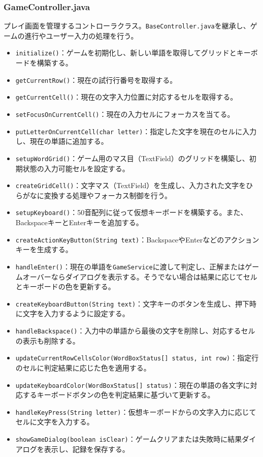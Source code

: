 \documentclass[a4j]{ujarticle}
\begin{document}
\subsubsection{GameController.java}
プレイ画面を管理するコントローラクラス。\texttt{BaseController.java}を継承し、ゲームの進行やユーザー入力の処理を行う。

\begin{itemize}
  \item \texttt{initialize()}：ゲームを初期化し、新しい単語を取得してグリッドとキーボードを構築する。
  \item \texttt{getCurrentRow()}：現在の試行行番号を取得する。
  \item \texttt{getCurrentCell()}：現在の文字入力位置に対応するセルを取得する。
  \item \texttt{setFocusOnCurrentCell()}：現在の入力セルにフォーカスを当てる。
  \item \texttt{putLetterOnCurrentCell(char letter)}：指定した文字を現在のセルに入力し、現在の単語に追加する。
  \item \texttt{setupWordGrid()}：ゲーム用のマス目（TextField）のグリッドを構築し、初期状態の入力可能セルを設定する。
  \item \texttt{createGridCell()}：文字マス（TextField）を生成し、入力された文字をひらがなに変換する処理やフォーカス制御を行う。
  \item \texttt{setupKeyboard()}：50音配列に従って仮想キーボードを構築する。また、BackspaceキーとEnterキーを追加する。
  \item \texttt{createActionKeyButton(String text)}：BackspaceやEnterなどのアクションキーを生成する。
  \item \texttt{handleEnter()}：現在の単語を\texttt{GameService}に渡して判定し、正解またはゲームオーバーならダイアログを表示する。そうでない場合は結果に応じてセルとキーボードの色を更新する。
  \item \texttt{createKeyboardButton(String text)}：文字キーのボタンを生成し、押下時に文字を入力するように設定する。
  \item \texttt{handleBackspace()}：入力中の単語から最後の文字を削除し、対応するセルの表示も削除する。
  \item \texttt{updateCurrentRowCellsColor(WordBoxStatus[] status, int row)}：指定行のセルに判定結果に応じた色を適用する。
  \item \texttt{updateKeyboardColor(WordBoxStatus[] status)}：現在の単語の各文字に対応するキーボードボタンの色を判定結果に基づいて更新する。
  \item \texttt{handleKeyPress(String letter)}：仮想キーボードからの文字入力に応じてセルに文字を入力する。
  \item \texttt{showGameDialog(boolean isClear)}：ゲームクリアまたは失敗時に結果ダイアログを表示し、記録を保存する。
\end{itemize}
\end{document}
